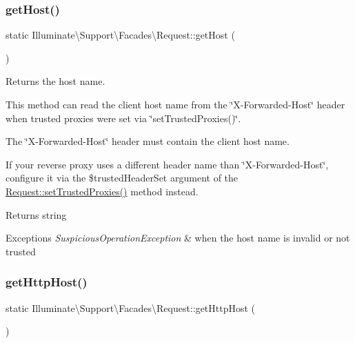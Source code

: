 \subsubsection{\texorpdfstring{get\+Host()}{getHost()}}
{\footnotesize\ttfamily static Illuminate\textbackslash{}\+Support\textbackslash{}\+Facades\textbackslash{}\+Request\+::get\+Host (\begin{DoxyParamCaption}{ }\end{DoxyParamCaption})\hspace{0.3cm}{\ttfamily [static]}}

Returns the host name.

This method can read the client host name from the \char`\"{}\+X-\/\+Forwarded-\/\+Host\char`\"{} header when trusted proxies were set via \char`\"{}set\+Trusted\+Proxies()\char`\"{}.

The \char`\"{}\+X-\/\+Forwarded-\/\+Host\char`\"{} header must contain the client host name.

If your reverse proxy uses a different header name than \char`\"{}\+X-\/\+Forwarded-\/\+Host\char`\"{}, configure it via the \$trusted\+Header\+Set argument of the \mbox{\hyperlink{class_illuminate_1_1_support_1_1_facades_1_1_request_a1686fbcf12f72ed06a19adf0633054fa}{Request\+::set\+Trusted\+Proxies()}} method instead.

\begin{DoxyReturn}{Returns}
string 
\end{DoxyReturn}

\begin{DoxyExceptions}{Exceptions}
{\em Suspicious\+Operation\+Exception} & when the host name is invalid or not trusted \\
\hline
\end{DoxyExceptions}
\mbox{\label{class_illuminate_1_1_support_1_1_facades_1_1_request_a94046dd08b0253ae63caf787fd1f9d80}} 
\subsubsection{\texorpdfstring{get\+Http\+Host()}{getHttpHost()}}
{\footnotesize\ttfamily static Illuminate\textbackslash{}\+Support\textbackslash{}\+Facades\textbackslash{}\+Request\+::get\+Http\+Host (\begin{DoxyParamCaption}{ }\end{DoxyParamCaption})\hspace{0.3cm}{\ttfamily [static]}}

